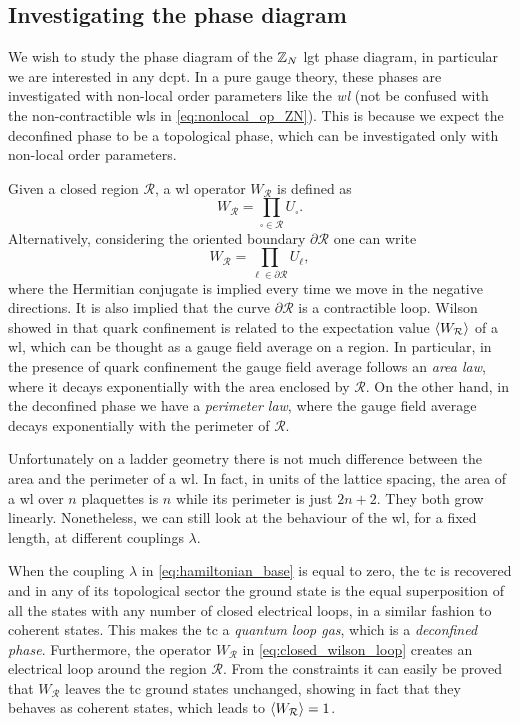 \subsection{Investigating the phase diagram}%
\label{sub:investigating_the_phase_diagram}

We wish to study the phase diagram of the $\mathbb{Z}_N$ \ac{lgt} phase diagram, in particular we are interested in any \ac{dcpt}.
In a pure gauge theory, these phases are investigated with non-local order parameters like the \emph{\ac{wl}} (not be confused with the non-contractible \ac{wl}s in \eqref{eq:nonlocal_op_ZN}).
This is because we expect the deconfined phase to be a topological phase, which can be investigated only with non-local order parameters.

Given a closed region $\mathcal{R}$, a \ac{wl} operator $W_{\mathcal{R}}$ is defined as
\begin{equation}
    W_{\mathcal{R}} = \prod_{\square \in \mathcal{R}} U_{\square}.
    \label{eq:closed_wilson_loop}
\end{equation}
Alternatively, considering the oriented boundary $\partial \mathcal{R}$ one can write
\begin{equation}
    W_{\mathcal{R}} = \prod_{\ell \in \partial \mathcal{R}} U_{\ell},
\end{equation}
where the Hermitian conjugate is implied every time we move in the negative directions.
It is also implied that the curve $\partial \mathcal{R}$ is a contractible loop.
Wilson showed in \cite{wilson1974confinement} that quark confinement is related to the expectation value $\ev{W_{\mathcal{R}}}$ of a \ac{wl}, which can be thought as a gauge field average on a region.
In particular, in the presence of quark confinement the gauge field average follows an \emph{area law}, where it decays exponentially with the area enclosed by $\mathcal{R}$.
On the other hand, in the deconfined phase we have a \emph{perimeter law}, where the gauge field average decays exponentially with the perimeter of $\mathcal{R}$.

Unfortunately on a ladder geometry there is not much difference between the area and the perimeter of a \ac{wl}.
In fact, in units of the lattice spacing, the area of a \ac{wl} over $n$ plaquettes is $n$ while its perimeter is just $2n+2$.
They both grow linearly.
Nonetheless, we can still look at the behaviour of the \ac{wl}, for a fixed length, at different couplings $\lambda$.

When the coupling $\lambda$ in \eqref{eq:hamiltonian_base} is equal to zero, the \ac{tc} is recovered and in any of its topological sector the ground state is the equal superposition of all the states with any number of closed electrical loops, in a similar fashion to coherent states.
This makes the \ac{tc} a \emph{quantum loop gas}, which is a \emph{deconfined phase}.
Furthermore, the operator $W_{\mathcal{R}}$ in \eqref{eq:closed_wilson_loop} creates an electrical loop around the region $\mathcal{R}$.
From the constraints
it can easily be proved that $W_{\mathcal{R}}$ leaves the \ac{tc} ground states unchanged, showing in fact that they behaves as coherent states, which leads to $\ev{W_{\mathcal{R}}} = 1$.

